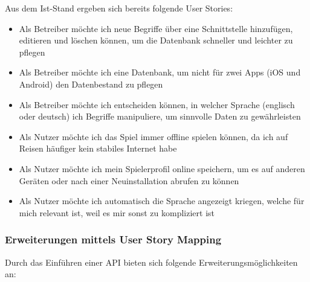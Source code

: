 {Aus dem Ist-Stand ergeben sich bereits folgende User Stories: 

\begin{itemize}
	\item Als Betreiber möchte ich neue Begriffe über eine Schnittstelle hinzufügen, editieren und löschen können, um die Datenbank schneller und leichter zu pflegen
	\item Als Betreiber möchte ich eine Datenbank, um nicht für zwei Apps (iOS und Android) den Datenbestand zu pflegen
	\item Als Betreiber möchte ich entscheiden können, in welcher Sprache (englisch oder deutsch) ich Begriffe manipuliere, um sinnvolle Daten zu gewährleisten
	\item Als Nutzer möchte ich das Spiel immer offline spielen können, da ich auf Reisen häufiger kein stabiles Internet habe
	\item Als Nutzer möchte ich mein Spielerprofil online speichern, um es auf anderen Geräten oder nach einer Neuinstallation abrufen zu können
	\item Als Nutzer möchte ich automatisch die Sprache angezeigt kriegen, welche für mich relevant ist, weil es mir sonst zu kompliziert ist
\end{itemize}

\subsubsection{Erweiterungen mittels User Story Mapping}

Durch das Einführen einer API bieten sich folgende Erweiterungsmöglichkeiten an:

}
